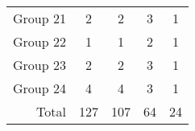 \begin{table}[H]
\begin{tabular}{@{}rcccc@{}}
        Group 21 & 2                               & 2                                         & 3                                          & 1                                      \\
        Group 22 & 1                               & 1                                         & 2                                          & 1                                      \\
        Group 23 & 2                               & 2                                         & 3                                          & 1                                      \\
        Group 24 & 4                               & 4                                         & 3                                          & 1                                      \\ \midrule
        Total    & 127                             & 107                                       & 64                                         & 24                                     \\
        \bottomrule
    \end{tabular}
\end{table}

